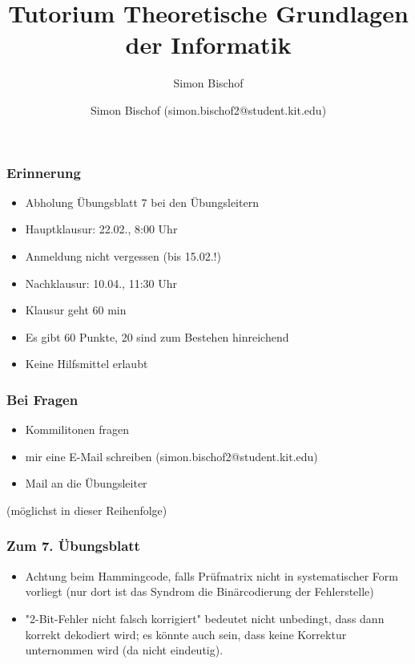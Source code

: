 \documentclass{beamer}
\author{Simon Bischof (simon.bischof2@student.kit.edu)}
\title{Tutorium Theoretische Grundlagen der Informatik}
\subtitle{Simon Bischof}
\institute{Institut f\"{u}r Kryptographie und Sicherheit}
\begin{document}
\begin{frame}
\maketitle
\end{frame}

\begin{frame}
\frametitle{Erinnerung}
\begin{itemize}
\item Abholung Übungsblatt 7 bei den Übungsleitern
\item Hauptklausur: 22.02., 8:00 Uhr
\item Anmeldung nicht vergessen (bis 15.02.!)
\item Nachklausur: 10.04., 11:30 Uhr
\item Klausur geht 60 min
\item Es gibt 60 Punkte, 20 sind zum Bestehen hinreichend
\item Keine Hilfsmittel erlaubt
\end{itemize}
\end{frame}

\begin{frame}
\frametitle{Bei Fragen}
\begin{itemize}
\item Kommilitonen fragen
\item mir eine E-Mail schreiben (simon.bischof2@student.kit.edu)
\item Mail an die Übungsleiter
\end{itemize}
(möglichst in dieser Reihenfolge)
\end{frame}

\begin{frame}
\frametitle{Zum 7. Übungsblatt}
\begin{itemize}
\item Achtung beim Hammingcode, falls Prüfmatrix nicht in systematischer Form vorliegt (nur dort ist das Syndrom die Binärcodierung der Fehlerstelle)
\item "2-Bit-Fehler nicht falsch korrigiert" bedeutet nicht unbedingt, dass dann korrekt dekodiert wird; es könnte auch sein, dass keine Korrektur unternommen wird (da nicht eindeutig).
\end{itemize}
\end{frame}
\end{document}

